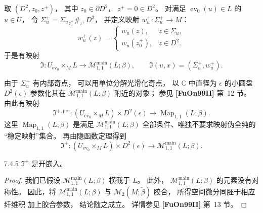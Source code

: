 取
$(D^2,z_0,z^+)$，
其中 $z_0\in\partial D^2$，
$z^+=0\in D^2$。
对满足 $\operatorname{ev}_0(u)\in L$ 的 $u\in U$，
令
$\Sigma_u^+=
\Sigma_u{}_{z_0^+}\#_{z^+}D^2$，
并定义映射
$w_u^+\colon\Sigma_u^+\to M$：
\[
w_u^+(z)=
\begin{cases}
w_u(z),&z\in\Sigma_u,\\
w_u(z_0^+),&z\in D^2.
\end{cases}
\]
于是有映射
\[
\mathfrak I\colon
U_{\operatorname{ev}_0}\times_M L
\longrightarrow
\mathcal M^{\mathrm{main}}_{1,1}(L;\beta),
\qquad
\mathfrak I(u,x)=(\Sigma_u^+,w_u^+).
\]

由于 $\Sigma_u^+$ 有内部奇点，
可以用单位分解光滑化奇点，
以 $\mathbb C$ 中直径为 $\epsilon$
的小圆盘 $D^2(\epsilon)$
参数化其在
$\mathcal M^{\mathrm{main}}_{1,1}(L;\beta)$
附近的对象；
参见 \textbf{[FuOn99II]} 第~12 节。
由此有映射
\begin{equation}
\mathfrak I^{+,\mathrm{pre}}\colon
(U_{\operatorname{ev}_0}\times_M L)
\times D^2(\epsilon)
\longrightarrow
\operatorname{Map}_{1,1}(L;\beta).
\tag{7.4.3}\label{eq:7-4-3}
\end{equation}
这里
$\operatorname{Map}_{1,1}(L;\beta)$
是满足
$\mathcal M^{\mathrm{main}}_{1,1}(L;\beta)$
全部条件、唯独不要求映射伪全纯的
“稳定映射”集合。
再由隐函数定理得到
\begin{equation}
\mathfrak I^+\colon
(U_{\operatorname{ev}_0}\times_M L)
\times D^2(\epsilon)
\longrightarrow
\mathcal M^{\mathrm{main}}_{1,1}(L;\beta).
\tag{7.4.4}\label{eq:7-4-4}
\end{equation}


\begin{lemma}{7.4.5}\label{lem:7-4-5}
$\mathfrak I^+$ 是开嵌入。
\end{lemma}
\begin{proof}
我们已假设
$\mathcal M^{\mathrm{main}}_{1,1}(L;\beta)$
横截于 $L$。
此外，
$\mathcal M^{\mathrm{main}}_{1,1}(L;\beta)$
的元素没有对称性。
因此，将
$\mathcal M^{\mathrm{main}}_{1,1}(L;\beta)$
与 $\mathcal M_2(M;\widetilde\beta)$ 胶合，
所得空间微分同胚于相应纤维积
加上胶合参数，
结论随之成立。
详情参见 \textbf{[FuOn99II]} 第~13 节。
\end{proof}

